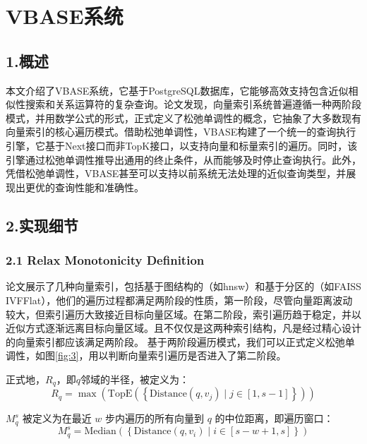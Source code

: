 \documentclass[12pt,UTF8,AutoFakeBold=2,a4paper]{ctexart} %
\begin{document}
{\section{VBASE系统}}
{\subsection{1.概述}}
本文介绍了VBASE系统，它基于PostgreSQL数据库，它能够高效支持包含近似相似性搜索和关系运算符的复杂查询。论文发现，向量索引系统普遍遵循一种两阶段模式，并用数学公式的形式，正式定义了松弛单调性的概念，它抽象了大多数现有向量索引的核心遍历模式。借助松弛单调性，VBASE构建了一个统一的查询执行引擎，它基于Next接口而非TopK接口，以支持向量和标量索引的遍历。同时，该引擎通过松弛单调性推导出通用的终止条件，从而能够及时停止查询执行。此外，凭借松弛单调性，VBASE甚至可以支持以前系统无法处理的近似查询类型，并展现出更优的查询性能和准确性。
{\subsection{2.实现细节}}
{\subsubsection{2.1 Relax Monotonicity Definition}}
论文展示了几种向量索引，包括基于图结构的（如hnsw）和基于分区的（如FAISS IVFFlat），他们的遍历过程都满足两阶段的性质，第一阶段，尽管向量距离波动较大，但索引遍历大致接近目标向量区域。在第二阶段，索引遍历趋于稳定，并以近似方式逐渐远离目标向量区域。且不仅仅是这两种索引结构，凡是经过精心设计的向量索引都应该满足两阶段。
基于两阶段遍历模式，我们可以正式定义松弛单调性，如图\ref{fig:3}，用以判断向量索引遍历是否进入了第二阶段。

正式地，\( R_q \)，即\( q \)邻域的半径，被定义为：
\begin{equation}
    R_q = \max\left(\text{TopE}\left(\left\{\text{Distance}(q, v_j) \mid j \in [1, s - 1] \right\}\right)\right)\tag{1}
\end{equation}

\( M_{q}^{s} \) 被定义为在最近 \( w \) 步内遍历的所有向量到 \( q \) 的中位距离，即遍历窗口：
\begin{equation}
    M_{q}^{s} = \text{Median}\left(\left\{\text{Distance}(q, v_i) \mid i \in [s - w + 1, s]\right\}\right) \tag{2}
\end{equation}
\end{document}
